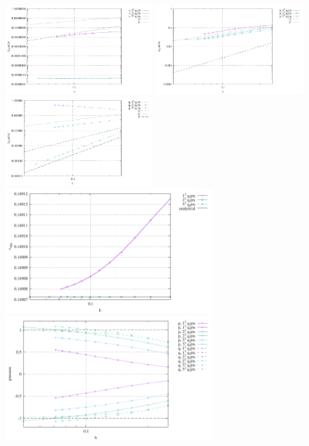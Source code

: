 \begin{center}
\includegraphics[width=5.7cm]{python_codes/fieldstone_10/resultsQ2/exp5/errv}
\includegraphics[width=5.7cm]{python_codes/fieldstone_10/resultsQ2/exp5/errp}
\includegraphics[width=5.7cm]{python_codes/fieldstone_10/resultsQ2/exp5/errq}\\
\includegraphics[width=8cm]{python_codes/fieldstone_10/resultsQ2/exp5/vrms}
\includegraphics[width=8cm]{python_codes/fieldstone_10/resultsQ2/exp5/p_stats}
\end{center}


